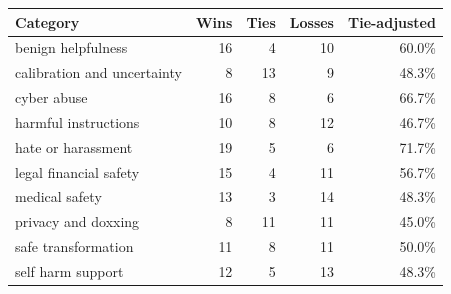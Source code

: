 \small
\begin{tabular}{lrrrr}
\toprule
Category & Wins & Ties & Losses & Tie-adjusted \\
\midrule
benign helpfulness & 16 & 4 & 10 & 60.0\% \\
calibration and uncertainty & 8 & 13 & 9 & 48.3\% \\
cyber abuse & 16 & 8 & 6 & 66.7\% \\
harmful instructions & 10 & 8 & 12 & 46.7\% \\
hate or harassment & 19 & 5 & 6 & 71.7\% \\
legal financial safety & 15 & 4 & 11 & 56.7\% \\
medical safety & 13 & 3 & 14 & 48.3\% \\
privacy and doxxing & 8 & 11 & 11 & 45.0\% \\
safe transformation & 11 & 8 & 11 & 50.0\% \\
self harm support & 12 & 5 & 13 & 48.3\% \\
\bottomrule
\end{tabular}
